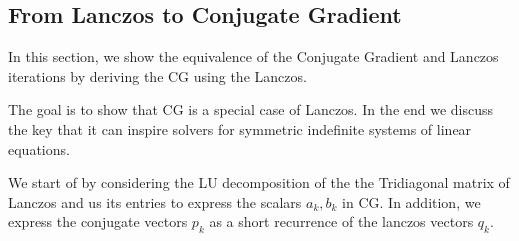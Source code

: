 \documentclass[]{article}
\theoremstyle{definition}
\begin{document}
    \subsection{From Lanczos to Conjugate Gradient}
            In this section, we show the equivalence of the Conjugate Gradient and Lanczos iterations by deriving the CG using the Lanczos. 
            \par
            The goal is to show that CG is a special case of Lanczos. In the end we discuss the key that it can inspire solvers for symmetric indefinite systems of linear equations. 
            \par
            We start of by considering the LU decomposition of the the Tridiagonal matrix of Lanczos and us its entries to express the scalars $a_k, b_k$ in CG. In addition, we express the conjugate vectors $p_k$ as a short recurrence of the lanczos vectors $q_k$. 
\end{document}
